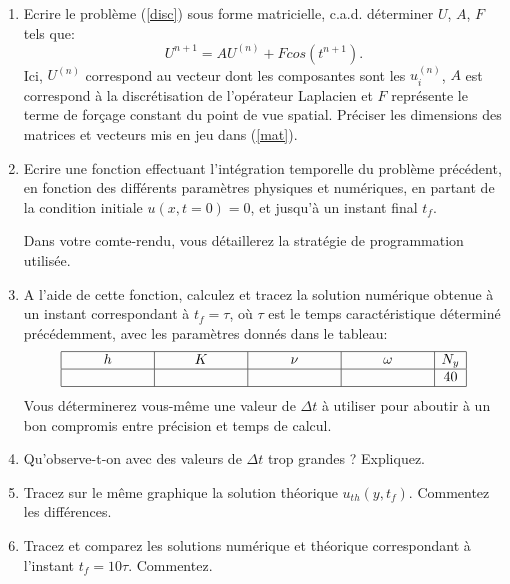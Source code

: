 \documentclass[a4,12pt]{article}
\begin{document}
\begin{enumerate}
\item Ecrire le probl\`eme (\ref{disc}) sous forme matricielle, c.a.d. d\'eterminer $U$, $A$, $F$ tels que:
\begin{equation}
\label{mat}
U^{n+1}=AU^{(n)} +F cos(t^{n+1}).
\end{equation}
\noindent
Ici, $U^{(n)}$ correspond au vecteur dont les composantes sont les $u_i^{(n)}$, $A$ est correspond 
\`a la discr\'etisation de l'op\'erateur Laplacien et $F$ repr\'esente le terme de for\c{c}age 
constant du point de vue spatial. Pr\'eciser les dimensions des
matrices et vecteurs mis en jeu dans (\ref{mat}). 

\item Ecrire une fonction effectuant l'intégration temporelle du problème précédent,
en fonction des différents paramètres physiques et numériques,
en partant de la condition initiale $u(x,t=0) = 0$, et jusqu'à un instant final $t_f$.

Dans votre comte-rendu, vous détaillerez la stratégie de programmation utilisée.

\item A l'aide de cette fonction, calculez et tracez la solution numérique obtenue à
un instant correspondant à $t_f = \tau$, où $\tau$ est le temps caractéristique
déterminé précédemment, avec les paramètres donnés dans le tableau:
$$
\begin{array}{|c|c|c|c|c|}
\hline
h & K & \nu & \omega & N_y \\
\hline
\hspace{2cm} & \hspace{2cm} & \hspace{2cm} & \hspace{2cm} & 40 \\
\hline
\end{array}
$$
Vous déterminerez vous-même une valeur de $\Delta t$ à utiliser pour aboutir
à un bon compromis entre précision et temps de calcul.


\item Qu'observe-t-on avec des valeurs de $\Delta t$ trop grandes ? Expliquez.

\item Tracez sur le même graphique la solution théorique $u_{th}(y,t_f)$.
Commentez les différences.

\item Tracez et comparez les solutions numérique et théorique 
correspondant à l'instant  $t_f = 10 \tau$. Commentez.



\end{enumerate}
\end{document}
